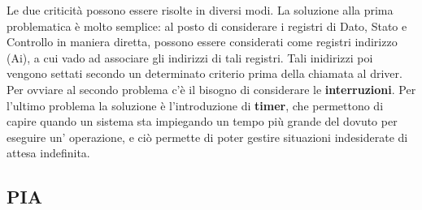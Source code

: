 Le due criticità possono essere risolte in diversi modi. La soluzione alla prima problematica è molto semplice: al posto di considerare i registri di Dato, Stato e Controllo in maniera diretta, possono essere considerati come registri indirizzo (Ai), a cui vado ad associare gli indirizzi di tali registri. Tali inidirizzi poi vengono settati secondo un determinato criterio prima della chiamata al driver.
Per ovviare al secondo problema c'è il bisogno di considerare le \textbf{interruzioni}. Per l'ultimo problema la soluzione è l'introduzione di \textbf{timer}, che permettono di capire quando un sistema sta impiegando un tempo più grande del dovuto per eseguire un' operazione, e ciò permette di poter gestire situazioni indesiderate di attesa indefinita.

\subsection{PIA} \label{par:PIA}

